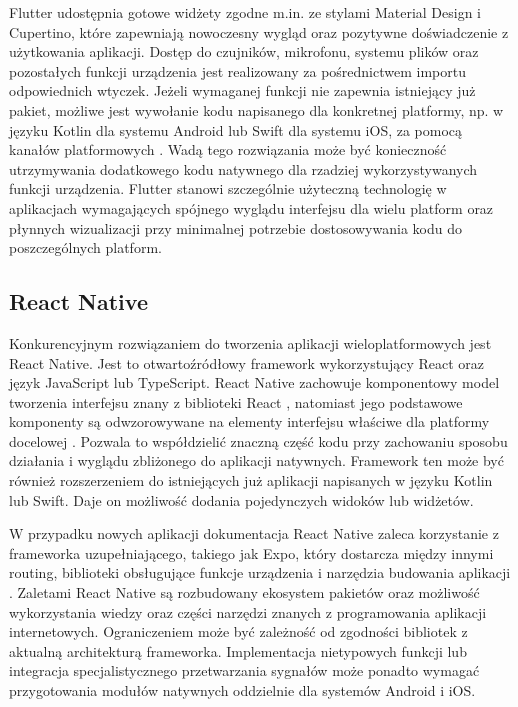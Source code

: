 Flutter udostępnia gotowe widżety zgodne m.in. ze stylami Material Design i Cupertino, które zapewniają nowoczesny wygląd oraz pozytywne doświadczenie z użytkowania aplikacji. Dostęp do czujników, mikrofonu, systemu plików oraz pozostałych funkcji urządzenia jest realizowany za pośrednictwem importu odpowiednich wtyczek. Jeżeli wymaganej funkcji nie zapewnia istniejący już pakiet, możliwe jest wywołanie kodu napisanego dla konkretnej platformy, np. w języku Kotlin dla systemu Android lub Swift dla systemu iOS, za pomocą kanałów platformowych \cite{flutterPlatformChannels2026}. Wadą tego rozwiązania może być konieczność utrzymywania dodatkowego kodu natywnego dla rzadziej wykorzystywanych funkcji urządzenia. Flutter stanowi szczególnie użyteczną technologię w aplikacjach wymagających spójnego wyglądu interfejsu dla wielu platform oraz płynnych wizualizacji przy minimalnej potrzebie dostosowywania kodu do poszczególnych platform.

\subsection{React Native}
Konkurencyjnym rozwiązaniem do tworzenia aplikacji wieloplatformowych jest React Native. Jest to otwartoźródłowy framework wykorzystujący React oraz język JavaScript lub TypeScript. React Native zachowuje komponentowy model tworzenia interfejsu znany z biblioteki React \cite{reactComponents2026}, natomiast jego podstawowe komponenty są odwzorowywane na elementy interfejsu właściwe dla platformy docelowej \cite{reactNativeDocs2026}. Pozwala to współdzielić znaczną część kodu przy zachowaniu sposobu działania i wyglądu zbliżonego do aplikacji natywnych. Framework ten może być również rozszerzeniem do istniejących już aplikacji napisanych w języku Kotlin lub Swift. Daje on możliwość dodania pojedynczych widoków lub widżetów.

W przypadku nowych aplikacji dokumentacja React Native zaleca korzystanie z frameworka uzupełniającego, takiego jak Expo, który dostarcza między innymi routing, biblioteki obsługujące funkcje urządzenia i narzędzia budowania aplikacji \cite{reactNativeGettingStarted2026}. Zaletami React Native są rozbudowany ekosystem pakietów oraz możliwość wykorzystania wiedzy oraz części narzędzi znanych z programowania aplikacji internetowych. Ograniczeniem może być zależność od zgodności bibliotek z aktualną architekturą frameworka. Implementacja nietypowych funkcji lub integracja specjalistycznego przetwarzania sygnałów może ponadto wymagać przygotowania modułów natywnych oddzielnie dla systemów Android i iOS.

